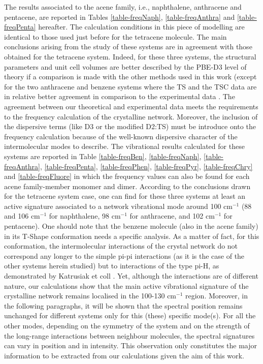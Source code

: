  	The results associated to the acene family, i.e., naphthalene, anthracene and pentacene, are reported in Tables \ref{table-freqNaph}, \ref{table-freqAnthra} and \ref{table-freqPenta} hereafter. The calculation conditions in this piece of modelling are identical to those used just before for the tetracene molecule. The main conclusions arising from the study of these systems are in agreement with those obtained for the tetracene system. Indeed, for these three systems, the structural parameters and unit cell volumes are better described by the PBE-D3 level of theory if a comparison is made with the other methods used in this work (except for the two anthracene and benzene systems where the TS and the TSC data are in relative better agreement in comparison to the experimental data \cite{buvcko2013tkatchenko}. The agreement between our theoretical and experimental data meets the requirements to the frequency calculation of the crystalline network. Moreover, the inclusion of the dispersive terms (like D3 or the modified D2:TS) must be introduce onto the frequency calculation because of the well-known dispersive character of the intermolecular modes to describe. The vibrational results calculated for these systems are reported in Table \ref{table-freqBen}, \ref{table-freqNaph}, \ref{table-freqAnthra}, \ref{table-freqPenta}, \ref{table-freqPhen}, \ref{table-freqPyr}, \ref{table-freqChry} and \ref{table-freqFluore} in which the frequency values can also be found for each acene family-member monomer and dimer. According to the conclusions drawn for the tetracene system case, one can find for these three systems at least an active signature associated to a network vibrational mode around 100 cm$^{-1}$ (88 and 106 cm$^{-1}$ for naphthalene, 98 cm$^{-1}$ for anthracene, and 102 cm$^{-1}$ for pentacene). One should note that the benzene molecule (also in the acene family) in its T-Shape conformation needs a specific analysis. As a matter of fact, for this conformation, the intermolecular interactions of the crystal network do not correspond any longer to the simple pi-pi interactions (as it is the case of the other systems herein studied) but to interactions of the type pi-H, as demonstrated by Katrusiak et coll \cite{katrusiak2010association}. Yet, although the interactions are of different nature, our calculations show that the main active vibrational signature of the crystalline network remains localised in the 100-130 cm$^{-1}$ region. Moreover, in the following paragraphs, it will be shown that the spectral position remains unchanged for different systems only for this (these) specific mode(s). For all the other modes, depending on the symmetry of the system and on the strength of the long-range interactions between neighbour molecules, the spectral signatures can vary in position and in intensity. This observation only constitutes the major information to be extracted from our calculations given the aim of this work.
